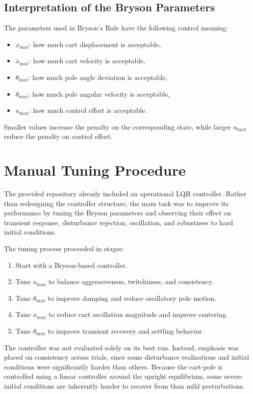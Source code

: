 \documentclass[11pt]{article}
\begin{document}
\subsection{Interpretation of the Bryson Parameters}
The parameters used in Bryson's Rule have the following control meaning:
\begin{itemize}[itemsep=2pt]
    \item $x_{\max}$: how much cart displacement is acceptable,
    \item $\dot{x}_{\max}$: how much cart velocity is acceptable,
    \item $\theta_{\max}$: how much pole angle deviation is acceptable,
    \item $\dot{\theta}_{\max}$: how much pole angular velocity is acceptable,
    \item $u_{\max}$: how much control effort is acceptable.
\end{itemize}

Smaller values increase the penalty on the corresponding state, while larger $u_{\max}$ reduce the penalty on control effort.

\section{Manual Tuning Procedure}
The provided repository already included an operational LQR controller. Rather than redesigning the controller structure, the main task was to improve its performance by tuning the Bryson parameters and observing their effect on transient response, disturbance rejection, oscillation, and robustness to hard initial conditions.

The tuning process proceeded in stages:
\begin{enumerate}[itemsep=2pt]
    \item Start with a Bryson-based controller.
    \item Tune $u_{\max}$ to balance aggressiveness, twitchiness, and consistency.
    \item Tune $\dot{\theta}_{\max}$ to improve damping and reduce oscillatory pole motion.
    \item Tune $x_{\max}$ to reduce cart oscillation magnitude and improve centering.
    \item Tune $\theta_{\max}$ to improve transient recovery and settling behavior.
\end{enumerate}

The controller was not evaluated solely on its best run. Instead, emphasis was placed on consistency across trials, since some disturbance realizations and initial conditions were significantly harder than others. Because the cart-pole is controlled using a linear controller around the upright equilibrium, some severe initial conditions are inherently harder to recover from than mild perturbations.
\end{document}
